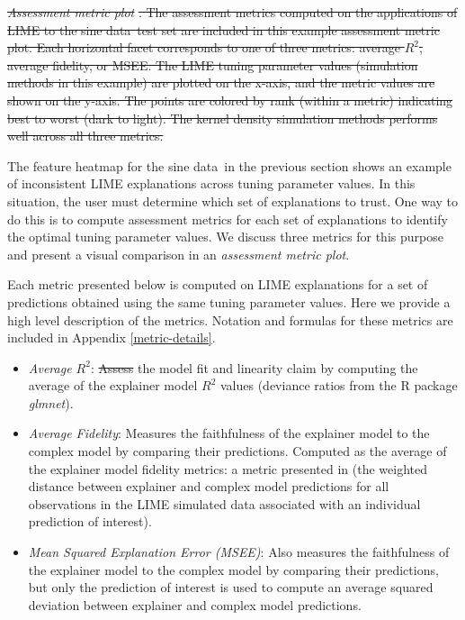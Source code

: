 \documentclass[AMS,STIX2COL]{WileyNJD-v2}\usepackage[]{graphicx}\usepackage[]{color}
\newcommand{\data}{sine data}
\providecommand{\DIFadd}[1]{{\protect\color{blue}\uwave{#1}}} %
\providecommand{\DIFdel}[1]{{\protect\color{red}\sout{#1}}}                      %
\providecommand{\DIFaddbegin}{} %
\providecommand{\DIFaddend}{} %
\providecommand{\DIFdelbegin}{} %
\providecommand{\DIFdelend}{} %
\providecommand{\DIFdelFL}[1]{\DIFdel{#1}} %
\newcommand{\DIFscaledelfig}{0.5}
\newlength{\DIFdelgraphicswidth} %
\newlength{\DIFdelgraphicsheight} %
\newcommand{\DIFaddincludegraphics}[2][]{{\color{blue}\fbox{\DIFOincludegraphics[#1]{#2}}}} %
\newcommand{\DIFdelincludegraphics}[2][]{%
\sbox{\DIFdelgraphicsbox}{\DIFOincludegraphics[#1]{#2}}%
\settoboxwidth{\DIFdelgraphicswidth}{\DIFdelgraphicsbox} %
\settoboxtotalheight{\DIFdelgraphicsheight}{\DIFdelgraphicsbox} %
\scalebox{\DIFscaledelfig}{%
\parbox[b]{\DIFdelgraphicswidth}{\usebox{\DIFdelgraphicsbox}\\[-\baselineskip] \rule{\DIFdelgraphicswidth}{0em}}\llap{\resizebox{\DIFdelgraphicswidth}{\DIFdelgraphicsheight}{%
\setlength{\unitlength}{\DIFdelgraphicswidth}%
\begin{picture}(1,1)%
\thicklines\linethickness{2pt} %
{\color[rgb]{1,0,0}\put(0,0){\framebox(1,1){}}}%
{\color[rgb]{1,0,0}\put(0,0){\line( 1,1){1}}}%
{\color[rgb]{1,0,0}\put(0,1){\line(1,-1){1}}}%
\end{picture}%
}\hspace*{3pt}}} %
} %
\DeclareRobustCommand{\DIFaddbegin}{\DIFOaddbegin \let\includegraphics\DIFaddincludegraphics} %
\DeclareRobustCommand{\DIFaddend}{\DIFOaddend \let\includegraphics\DIFOincludegraphics} %
\DeclareRobustCommand{\DIFdelbegin}{\DIFOdelbegin \let\includegraphics\DIFdelincludegraphics} %
\DeclareRobustCommand{\DIFdelend}{\DIFOaddend \let\includegraphics\DIFOincludegraphics} %
\begin{document}


{%
\emph{\DIFdelFL{Assessment metric plot}}%
\DIFdelFL{. The assessment metrics computed on the applications of LIME to the \data \ test set are included in this example assessment metric plot. Each horizontal facet corresponds to one of three metrics: average $R^2$, average fidelity, or MSEE. The LIME tuning parameter values (simulation methods in this example) are plotted on the x-axis, and the metric values are shown on the y-axis. The points are colored by rank (within a metric) indicating best to worst (dark to light). The kernel density simulation methods performs well across all three metrics.}}

\DIFdelend The feature heatmap for the \data \ in the previous section shows an example of inconsistent LIME explanations across tuning parameter values. In this situation, the user must determine which set of explanations to trust. One way to do this is to compute assessment metrics for each set of explanations to identify the optimal tuning parameter values. We discuss three metrics for this purpose and present a visual comparison in an \emph{assessment metric plot}.

Each metric presented below is computed on LIME explanations for a set of predictions obtained using the same tuning parameter values. Here we provide a high level description of the metrics. Notation and formulas for these metrics are included in Appendix \ref{metric-details}.

\begin{itemize}
\item \emph{Average $R^2$}: \DIFdelbegin \DIFdel{Assess }\DIFdelend \DIFaddbegin \DIFadd{Assesses }\DIFaddend the model fit and linearity claim by computing the average of the explainer model $R^2$ values (deviance ratios from the R package \emph{glmnet}).

\item \emph{Average Fidelity}: Measures the faithfulness of the explainer model to the complex model by comparing their predictions. Computed as the average of the explainer model fidelity metrics: a metric presented in \citet{ribeiro:2016} (the weighted distance between explainer and complex model predictions for all observations in the LIME simulated data associated with an individual prediction of interest).

\item \emph{Mean Squared Explanation Error (MSEE)}: Also measures the faithfulness of the explainer model to the complex model by comparing their predictions, but only the prediction of interest is used to compute an average squared deviation between explainer and complex model predictions.
\end{itemize}
\end{document}
